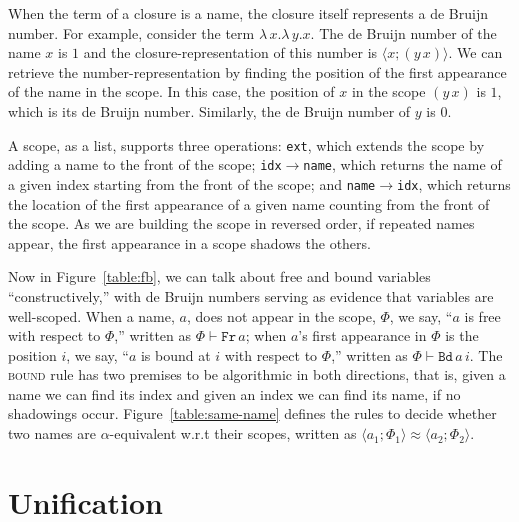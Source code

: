\documentclass[a4paper,UKenglish]{lipics-v2016}
\newcommand{\clos}[2] {
  \langle #1; #2 \rangle
}
\newcommand{\aeq}[4] {
  \clos{#1}{#2} \approx \clos{#3}{#4}
}
\newcommand*{\transname}[1]{\textsc{#1}}
\begin{document}
When the term of a closure is a name, the closure itself represents a
de Bruijn number.  For example, consider the term
$\lambda\,x.\lambda\,y.x$. The de Bruijn number of the name $x$ is $1$
and the closure-representation of this number is $\clos{x}{(y\,x)}$.
We can retrieve the number-representation by finding the position of
the first appearance of the name in the scope. In this case, the
position of $x$ in the scope $(y\,x)$ is $1$, which is its de Bruijn
number. Similarly, the de Bruijn number of $y$ is $0$.

A scope, as a list, supports three operations: \texttt{ext},
which extends the scope by adding a name to the front of the scope;
\texttt{idx$\rightarrow$name}, which returns the name of a given index
starting from the front of the scope; and
\texttt{name$\rightarrow$idx}, which returns the location of the first
appearance of a given name counting from the front of the scope.  As we
are building the scope in reversed order, if repeated names appear, the
first appearance in a scope shadows the others.

Now in Figure~\ref{table:fb}, we can talk about free and bound
variables ``constructively,'' with de Bruijn numbers serving as
evidence that variables are well-scoped.  When a name, $a$, does not
appear in the scope, $\Phi$, we say, ``$a$ is free with respect to
$\Phi$,'' written as $\Phi \vdash \texttt{Fr}\, a$; when $a$'s first
appearance in $\Phi$ is the position $i$, we say, ``$a$ is bound at
$i$ with respect to $\Phi$,'' written as $\Phi \vdash \texttt{Bd}\,
a\,i$.  The \transname{bound} rule has two premises to be algorithmic
in both directions, that is, given a name we can find its index and
given an index we can find its name, if no shadowings occur.
Figure~\ref{table:same-name} defines the rules to decide whether two
names are $\alpha$-equivalent w.r.t their scopes, written as
$\aeq{a_1}{\Phi_1}{a_2}{\Phi_2}$.

\pagebreak

\section{Unification}
\end{document}
